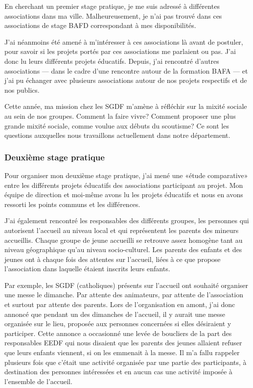 \documentclass[titlepage,11pt,a4paper]{article}
\begin{document}
En cherchant un premier stage pratique, je me suis
adressé à différentes associations dans ma ville. Malheureusement, je n'ai pas trouvé dans
ces associations de stage BAFD correspondant à mes disponibilités.

J'ai néanmoins été amené à m'intéresser à ces associations là avant de postuler, pour
savoir si les projets portés par ces associations me parlaient ou pas. J'ai donc lu leurs
différents projets éducatifs. Depuis, j'ai rencontré d'autres associations --- dans le cadre
d'une rencontre autour de la formation BAFA --- et j'ai pu échanger avec plusieurs
associations autour de nos projets respectifs et de nos publics.

Cette année, ma mission chez les SGDF m'amène à réfléchir sur la mixité sociale au sein de
nos groupes. Comment la faire vivre? Comment proposer une plus grande mixité sociale,
comme voulue aux débuts du scoutisme? Ce sont les questions auxquelles nous travaillons
actuellement dans notre département.

\subsubsection{Deuxième stage pratique}

Pour organiser mon deuxième stage pratique, j'ai mené une «étude comparative» entre les
différents projets éducatifs des associations participant au projet. Mon équipe de
direction et moi-même avons lu les projets éducatifs et nous en avons ressorti les
points communs et les différences.

J'ai également rencontré les responsables des différents groupes, les personnes qui
autorisent l'accueil au niveau local et qui représentent les parents des mineurs
accueillis. Chaque groupe de jeune accueilli se retrouve assez homogène tant au niveau
géographique qu'au niveau socio-culturel. Les parents des enfants et des jeunes ont à
chaque fois des attentes sur l'accueil, liées à ce que propose l'association dans laquelle
étaient inscrits leurs enfants.

Par exemple, les SGDF (catholiques) présents sur l'accueil ont souhaité organiser une
messe le dimanche. Par attente des animateurs, par attente de l'association et surtout
par attente des parents. Lors de l'organisation en amont, j'ai donc annoncé que pendant
un des dimanches de l'accueil, il y aurait une messe organisée sur le lieu, proposée aux personnes
concernées si elles désiraient y participer. Cette annonce a occasionné une levée de
boucliers de la part des responsables EEDF qui nous disaient que les parents des jeunes
allaient refuser que leurs enfants viennent, si on les emmenait à la messe. Il m'a fallu
rappeler plusieurs fois que c'était une activité organisée par une partie des
participants, à destination des personnes intéressées et en aucun cas une activité imposée
à l'ensemble de l'accueil.
\end{document}
